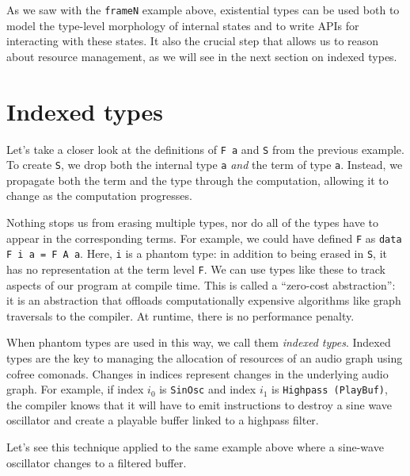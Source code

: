 \documentclass{article}
\begin{document}
As we saw with the \texttt{frameN} example above, existential types can be used both to model the type-level morphology of internal states and to write APIs for interacting with these states. It also the crucial step that allows us to reason about resource management, as we will see in the next section on indexed types.

\section{Indexed types}
\label{sec:indexed_types}

Let's take a closer look at the definitions of \texttt{F a} and \texttt{S} from the previous example. To create \texttt{S}, we drop both the internal type \texttt{a} \textit{and} the term of type \texttt{a}. Instead, we propagate both the term and the type through the computation, allowing it to change as the computation progresses.

Nothing stops us from erasing multiple types, nor do all of the types have to appear in the corresponding terms. For example, we could have defined \texttt{F} as \texttt{data F i a = F A a}. Here, \texttt{i} is a phantom type: in addition to being erased in \texttt{S}, it has no representation at the term level \texttt{F}. We can use types like these to track aspects of our program at compile time. This is called a ``zero-cost abstraction'': it is an abstraction that offloads computationally expensive algorithms like graph traversals to the compiler. At runtime, there is no performance penalty.

When phantom types are used in this way, we call them \textit{indexed types}. Indexed types are the key to managing the allocation of resources of an audio graph using cofree comonads. Changes in indices represent changes in the underlying audio graph. For example, if index $i_0$ is \texttt{SinOsc} and index $i_1$ is \texttt {Highpass (PlayBuf)}, the compiler knows that it will have to emit instructions to destroy a sine wave oscillator and create a playable buffer linked to a highpass filter.

Let's see this technique applied to the same example above where a sine-wave oscillator changes to a filtered buffer.
\end{document}
